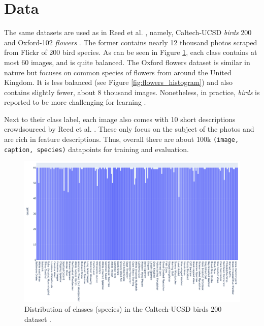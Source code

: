 \section{Data}

The same datasets are used as in Reed et al. \cite{reed2016learning}, namely, Caltech-UCSD \textit{birds} 200 \cite{welinder2010caltech} and Oxford-102 \textit{flowers} \cite{Nilsback08}. The former contains nearly 12 thousand photos scraped from Flickr of 200 bird species. As can be seen in Figure \ref{fig:birds_histogram}, each class contains at most 60 images, and is quite balanced. The Oxford flowers dataset is similar in nature but focuses on common species of flowers from around the United Kingdom. It is less balanced (see Figure \ref{fig:flowers_histogram}) and also contains slightly fewer, about 8 thousand images. Nonetheless, in practice, \textit{birds} is reported to be more challenging for learning \cite{reed2016learning,reed2016generative}.

Next to their class label, each image also comes with 10 short descriptions crowdsourced by Reed et al. \cite{reed2016learning}. These only focus on the subject of the photos and are rich in feature descriptions. Thus, overall there are about 100k \texttt{(image, caption, species)} datapoints for training and evaluation.

\begin{figure}
  \centering
  \includegraphics[width=1 \linewidth]{figures/bird_classes.png}
  \caption{Distribution of classes (species) in the Caltech-UCSD birds 200 dataset \cite{welinder2010caltech}.}
  \label{fig:birds_histogram}
\end{figure}

